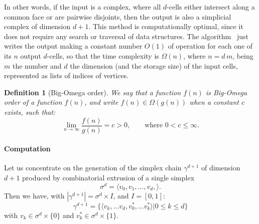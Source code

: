 \documentclass[11pt,oneside]{article}	%
\newtheorem{definition}{Definition}
\begin{document}
In other words, if the input is a complex, where all $d$-cells either intersect along a common face or are pairwise disjoints, then the output is also a simplicial complex of dimension $d+1$. This method is computationally optimal, since it does not require any search or traversal of data structures. The algorithm~\cite{DBLP:journals/cad/FerruciP91} just writes the output making a constant number $O(1)$ of operation for each one of its $n$ output $d$-cells, so that the time complexity is $\Omega(n)$, where $n = d\,m$, being $m$ the number and $d$ the dimension (and the storage size) of the input cells, represented as lists of indices of vertices.

\begin{definition}[Big-Omega order]
We say that a function $f(n)$ is \emph{Big-Omega} order of a function $f(n)$, and write 
$f(n) \in \Omega(g(n))$ when a constant $c$ exists, such that:
\[
\lim_{n\to\infty} \frac{f(n)}{g(n)}=c>0,\qquad \mbox{where\ } 0<c\leq\infty.
\]
\end{definition}

\paragraph{Computation}

Let us concentrate on the generation of the simplex chain $\gamma^{d+1}$ of dimension $d+1$ produced by combinatorial extrusion of a single simplex 
\[
\sigma^d = \langle v_0, v_1, \ldots, v_d,   \rangle .
\]
Then we have, with $|\gamma^{d+1}| = \sigma^d \times I$, and $I=[0,1]$:
\[
\gamma^{d+1} = \{ \langle v_k, \ldots v_d, v^*_0, \ldots  v^*_k \rangle | 0\leq k\leq d \}
\]
with $v_k\in \sigma^d \times \{0\}$ and  $v^*_k\in \sigma^d \times \{1\}$.
\end{document}
